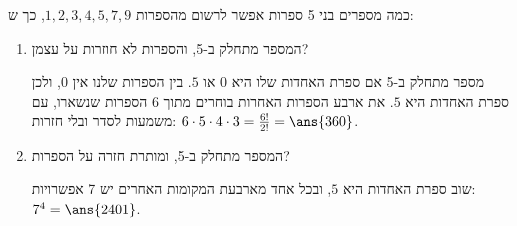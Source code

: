 כמה מספרים בני 5 ספרות אפשר לרשום מהספרות $1,2,3,4,5,7,9$, כך ש:
\begin{enumerate}
\item המספר מתחלק ב-5, והספרות לא חוזרות על עצמן?
\begin{solbox}
מספר מתחלק ב-5 אם ספרת האחדות שלו היא $0$ או $5$. בין הספרות שלנו אין $0$, ולכן ספרת האחדות היא $5$. את ארבע הספרות האחרות בוחרים מתוך 6 הספרות שנשארו, עם משמעות לסדר ובלי חזרות: $6\cdot5\cdot4\cdot3=\frac{6!}{2!}=\ans{360}$.
\end{solbox}
\item המספר מתחלק ב-5, ומותרת חזרה על הספרות?
\begin{solbox}
שוב ספרת האחדות היא $5$, ובכל אחד מארבעת המקומות האחרים יש 7 אפשרויות: $7^4=\ans{2401}$.
\end{solbox}
\end{enumerate}
